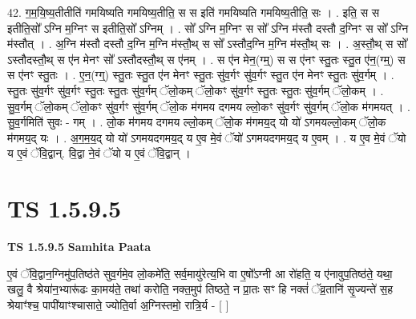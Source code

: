\documentclass[17pt]{extarticle}
\begin{document}
42. ग॒म॒यि॒ष्य॒तीतीति॑ गमयिष्यति गमयिष्य॒तीति॒ स स इति॑ गमयिष्यति गमयिष्य॒तीति॒ सः । . इति॒ स स इतीति॒सो᳚ ऽग्नि म॒ग्निꣳ स इतीति॒सो᳚ ऽग्निम् । . सो᳚ ऽग्नि म॒ग्निꣳ स सो᳚ ऽग्नि म॑स्तौ दस्तौ द॒ग्निꣳ स सो᳚ ऽग्नि म॑स्तौत् । . अ॒ग्नि म॑स्तौ दस्तौ द॒ग्नि म॒ग्नि म॑स्तौ॒थ् स सो᳚ ऽस्तौद॒ग्नि म॒ग्नि म॑स्तौ॒थ् सः । . अ॒स्तौ॒थ् स सो᳚ ऽस्तौदस्तौ॒थ् स ए॑न मेनꣳ सो᳚ ऽस्तौदस्तौ॒थ् स ए॑नम् । . स ए॑न मेन॒(ग्म्॒) स स ए॑नꣳ स्तु॒तः स्तु॒त ए॑न॒(ग्म्॒) स स ए॑नꣳ स्तु॒तः । . ए॒न॒(ग्ग्॒) स्तु॒तः स्तु॒त ए॑न मेनꣳ स्तु॒तः सु॑व॒र्गꣳ सु॑व॒र्गꣳ स्तु॒त ए॑न मेनꣳ स्तु॒तः सु॑व॒र्गम् । . स्तु॒तः सु॑व॒र्गꣳ सु॑व॒र्गꣳ स्तु॒तः स्तु॒तः सु॑व॒र्गम् ॅलो॒कम् ॅलो॒कꣳ सु॑व॒र्गꣳ स्तु॒तः स्तु॒तः सु॑व॒र्गम् ॅलो॒कम् । . सु॒व॒र्गम् ॅलो॒कम् ॅलो॒कꣳ सु॑व॒र्गꣳ सु॑व॒र्गम् ॅलो॒क म॑गमय दगमय ल्लो॒कꣳ सु॑व॒र्गꣳ सु॑व॒र्गम् ॅलो॒क म॑गमयत् । . सु॒व॒र्गमिति॑ सुवः - गम् । . लो॒क म॑गमय दगमय ल्लो॒कम् ॅलो॒क म॑गमय॒द् यो यो॑ ऽगमयल्लो॒कम् ॅलो॒क म॑गमय॒द् यः । . अ॒ग॒म॒य॒द् यो यो॑ ऽगमयदगमय॒द् य ए॒व मे॒वं ॅयो॑ ऽगमयदगमय॒द् य ए॒वम् । . य ए॒व मे॒वं ॅयो य ए॒वं ॅवि॒द्वान्. वि॒द्वा ने॒वं ॅयो य ए॒वं ॅवि॒द्वान् । \newline
\pagebreak
{}

\section{ TS 1.5.9.5 }

\textbf{TS 1.5.9.5 } \newline
\textbf{Samhita Paata} \newline

ए॒वं ॅवि॒द्वान॒ग्निमु॑प॒तिष्ठ॑ते सुव॒र्गमे॒व लो॒कमे॑ति॒ सर्व॒मायु॑रेत्य॒भि वा ए॒षो᳚ऽग्नी आ रो॑हति॒ य ए॑नावुप॒तिष्ठ॑ते॒ यथा॒ खलु॒ वै श्रेया॑न॒भ्यारू॑ढः का॒मय॑ते॒ तथा॑ करोति॒ नक्त॒मुप॑ तिष्ठते॒ न प्रा॒तः सꣳ हि नक्तं॑ ॅव्र॒तानि॑ सृ॒ज्यन्ते॑ स॒ह श्रेयाꣳ॑श्च॒ पापी॑याꣳश्चासाते॒ ज्योति॒र्वा अ॒ग्निस्तमो॒ रात्रि॒र्य - [ ] \newline
\end{document}
